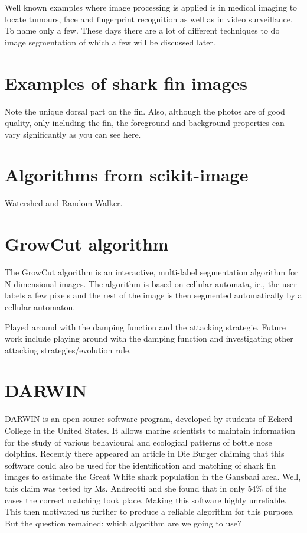 \documentclass[a4paper,10pt]{article}
\begin{document}
Well known
examples where image processing is applied is in medical imaging to locate
tumours, face and fingerprint recognition as well as in video surveillance.  To
name only a few.  These days there are a lot of different techniques to do image
segmentation of which a few will be discussed later.


\section{Examples of shark fin images}
Note the unique dorsal part on the fin.  Also, although the photos are of good
quality, only including the fin, the foreground and background properties can
vary significantly as you can see here.


\section{Algorithms from scikit-image}
Watershed and Random Walker.


\section{GrowCut algorithm}
The GrowCut algorithm is an interactive, multi-label segmentation
algorithm for N-dimensional images.  The algorithm is based on cellular
automata, ie.,  the user labels a few pixels and the rest of the image is then
segmented automatically by a cellular automaton. 

Played around with the damping function and the attacking strategie.
Future work include playing around with the damping function and investigating other attacking strategies/evolution rule.


\section{DARWIN}
DARWIN is an open source software program, developed by students of Eckerd
College in the United States. It allows marine scientists to maintain
information for the study of various behavioural and ecological patterns of
bottle nose dolphins.  Recently there appeared an article in Die Burger claiming
that this software could also be used for the identification and matching of
shark fin images to estimate the Great White shark population in the Gansbaai
area.  Well, this claim was tested by Ms. Andreotti and she found that in only
54\% of the cases the correct matching took place.  Making this software highly
unreliable. This then motivated us further to produce a reliable algorithm for
this purpose.  But the question remained: which algorithm are we going to use?
\end{document}
